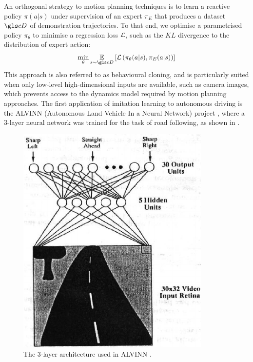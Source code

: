 An orthogonal strategy to motion planning techniques is to learn a reactive policy $\pi(a|s)$ under supervision of an expert $\pi_E$ that produces a dataset $\cD$ of demonstration trajectories. To that end, we optimise a parametrised policy $\pi_\theta$ to minimise a regression loss $\mathcal{L}$, such as the $KL$ divergence to the distribution of expert action:
\begin{equation*}
\min_\theta \expectedvalue_{s\sim \cD} \left[\cL\left(\pi_{\theta}(a|s), \pi_E(a|s)\right)\right]
\end{equation*}
This approach is also referred to as behavioural cloning, and is particularly suited when only low-level high-dimensional inputs are available, such as camera images, which prevents access to the dynamics model required by motion planning approaches. 
The first application of imitation learning to autonomous driving is the ALVINN (Autonomous Land Vehicle In a Neural Network) project \citep{Pomerleau1989}, where a 3-layer neural network was trained for the task of road following, as shown in .
\begin{figure}[th]
	\centering
	\includegraphics[width=0.4\linewidth]{img/alvinn}
	\caption{The 3-layer architecture used in ALVINN \citep{Pomerleau1989}.}
	\label{fig:alvinn}
\end{figure}

